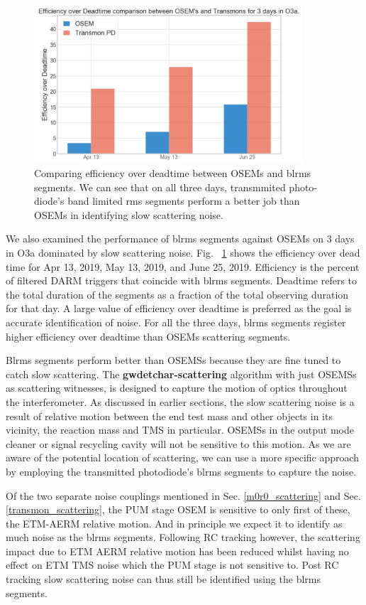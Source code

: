\documentclass[12pt]{iopart}
\begin{document}
\begin{figure}[h]
    \centering
    \includegraphics[width=10cm]{osemtransmon1.png}
    \caption{Comparing efficiency over deadtime between OSEMs and blrms segments. We can see that on all three days, transmmited photo-diode's band limited rms segments perform a better job than OSEMs in identifying slow scattering noise.}
    \label{fig:osemtrans}
\end{figure}

We also examined the performance of blrms segments against OSEMs on 3 days in O3a dominated by slow scattering noise. Fig. ~\ref{fig:osemtrans} shows the efficiency over dead time for Apr 13, 2019, May 13, 2019, and June 25, 2019. Efficiency is the percent of filtered DARM triggers that coincide with blrms segments. Deadtime refers to the total duration of the segments as a fraction of the total observing duration for that day. A large value of efficiency over deadtime is preferred as the goal is accurate identification of  noise. For all the three days, blrms segments register higher efficiency over deadtime than OSEMs scattering segments.

Blrms segments perform better than OSEMSs because they are fine tuned to catch slow scattering. The \textbf{gwdetchar-scattering} algorithm with just OSEMSs as scattering witnesses, is designed to capture the motion of optics throughout the interferometer. As discussed in earlier sections, the slow scattering noise is a result of relative motion between the end test mass and other objects in its vicinity, the reaction mass and TMS in particular. OSEMSs in the output mode cleaner or signal recycling cavity will not be sensitive to this motion. As we are aware of the potential location of scattering, we can use a more specific approach by employing the transmitted photodiode’s blrms segments to capture the noise. 


Of the two separate noise couplings mentioned in Sec. \ref{m0r0_scattering}  and Sec. \ref{transmon_scattering}, the PUM stage OSEM is sensitive to only first of these, the ETM-AERM relative motion. And in principle we expect it to identify as much noise as the blrms segments. Following RC tracking however, the scattering impact due to ETM AERM relative motion has been reduced whilst having no effect on ETM TMS noise which the PUM stage is not sensitive to. Post RC tracking slow scattering noise can thus still be identified using the blrms segments.
\end{document}
